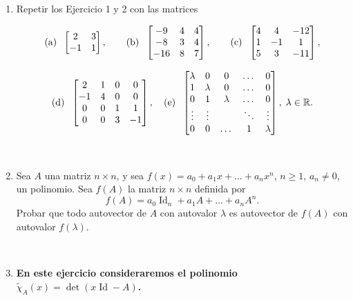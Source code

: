 \documentclass[12pt]{amsart}
\begin{document}
\begin{enumerate}[resume]

\item\label{mas} Repetir los Ejercicio 1 y 2 con las matrices

$$\textrm{(a)\; }\begin{bmatrix} 2 & 3 \\ -1 & 1
\end{bmatrix}, \qquad
\textrm{(b)\; }\begin{bmatrix} -9 & 4 & 4 \\ -8 & 3 & 4 \\ -16 & 8 & 7 \end{bmatrix}, \qquad \textrm{(c)\; } \left[\begin{matrix}4 & 4 & -12\\ 1 & -1 & 1\\ 5 & 3 & -11 \end{matrix} \right],$$

$$
\textrm{(d)\; } \left[\begin{matrix}2 & 1 & 0 & 0\\ -1 & 4 & 0 & 0\\ 0 & 0 & 1 & 1 \\ 0 & 0 & 3 & -1\end{matrix} \right],
\quad \textrm{(e)\; } \begin{bmatrix} \lambda & 0 & 0 & \dots & 0  \\ 1 & \lambda & 0 &\dots & 0  \\ 0 & 1 & \lambda&  \dots & 0  \\ \vdots & \vdots & \quad & \ddots & \vdots\\ 0 &  0&   \dots & 1  & \lambda \end{bmatrix}, \; \lambda\in \mathbb R.
$$

\

\item Sea $A$ una matriz $n\times n$, y sea $f(x) = a_0 + a_1 x + \dots + a_nx^n$, $n \geq 1$, $a_n \neq 0$, un polinomio. Sea $f(A)$ la matriz $n \times n$ definida por
$$f(A) = a_0 \operatorname{Id}_n + a_1 A + \dots + a_n A^n.$$
Probar que todo autovector de $A$ con autovalor $\lambda$ es autovector de $f(A)$ con autovalor $f(\lambda)$.

\

\item {\bf En este ejercicio consideraremos el polinomio $\tilde\chi_A(x)=\det(x\operatorname{Id}-A)$.}

\begin{enumerate}
 

\end{enumerate}
\end{enumerate}
\end{document}
